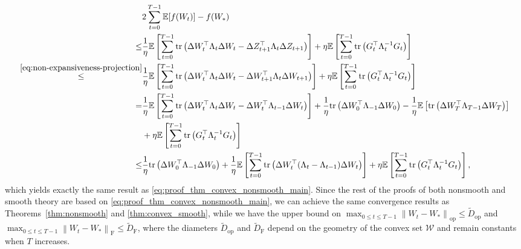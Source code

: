 \documentclass{article}
\theoremstyle{remark}
\newcommand{\Norm}[1]{\left\|#1\right\|}
\newcommand{\tr}[1]{{\rm tr}\left( #1 \right)}
\newcommand{\cW}{\mathcal{W}}
\newcommand{\EE}{\mathbb{E}}
\newcommand{\tW}{\Delta W}
\begin{document}
\begin{align*}
    &2\sum_{t=0}^{T-1} \EE[f(W_t)] -f(W_*) \\
    \le& \frac{1}{\eta} \EE\left[ \sum_{t=0}^{T-1} \tr{\tW_{t}^\top \Lambda_t \tW_{t} - \Delta Z_{t+1}^\top \Lambda_t \Delta Z_{t+1}} \right] + \eta \EE\left[ \sum_{t=0}^{T-1} \tr{G_t^\top \Lambda_t^{-1} G_t} \right] \\
    \overset{\eqref{eq:non-expansiveness-projection}}{\le} & \frac{1}{\eta} \EE\left[ \sum_{t=0}^{T-1} \tr{\tW_{t}^\top \Lambda_t \tW_{t} - \Delta W_{t+1}^\top \Lambda_t \Delta W_{t+1}} \right] + \eta \EE\left[ \sum_{t=0}^{T-1} \tr{G_t^\top \Lambda_t^{-1} G_t} \right] \\
    =&
    \frac{1}{\eta} \EE\left[ \sum_{t=0}^{T-1} \tr{\tW_{t}^\top \Lambda_t \tW_{t} - \tW_{t}^\top \Lambda_{t-1} \tW_{t}} \right] + \frac{1}{\eta} \tr{\tW_0^\top \Lambda_{-1} \tW_0} - \frac{1}{\eta} \EE\left[ \tr{\tW_T^\top \Lambda_{T-1} \tW_T} \right] \\
    &+ \eta \EE\left[ \sum_{t=0}^{T-1} \tr{G_t^\top \Lambda_t^{-1} G_t} \right] \\
    \le&
    \frac{1}{\eta} \tr{\tW_0^\top \Lambda_{-1} \tW_0} + \frac{1}{\eta} \EE\left[ \sum_{t=0}^{T-1} \tr{\tW_{t}^\top (\Lambda_t - \Lambda_{t-1}) \tW_{t} } \right] + \eta \EE\left[ \sum_{t=0}^{T-1} \tr{G_t^\top \Lambda_t^{-1} G_t} \right] ,
\end{align*}
which 
yields 
exactly the same result as \eqref{eq:proof_thm_convex_nonsmooth_main}. Since the rest of the proofs of both nonsmooth and smooth theory are based on \eqref{eq:proof_thm_convex_nonsmooth_main}, we can achieve the same convergence results as Theorems~\ref{thm:nonsmooth} and \ref{thm:convex_smooth}, while we have the upper bound on $\max_{0\le t \le T-1} \Norm{W_t - W_*}_{\mathrm{op}} \le \tilde{D}_{\mathrm{op}}$ and $\max_{0\le t \le T-1} \Norm{W_t - W_*}_{\mathrm{F}} \le \tilde{D}_{\mathrm{F}}$, where the diameters $\tilde{D}_{\mathrm{op}}$ and $\tilde{D}_{\mathrm{F}}$ depend on the geometry of the convex set $\cW$ and remain constants when $T$ increases.
\end{document}
